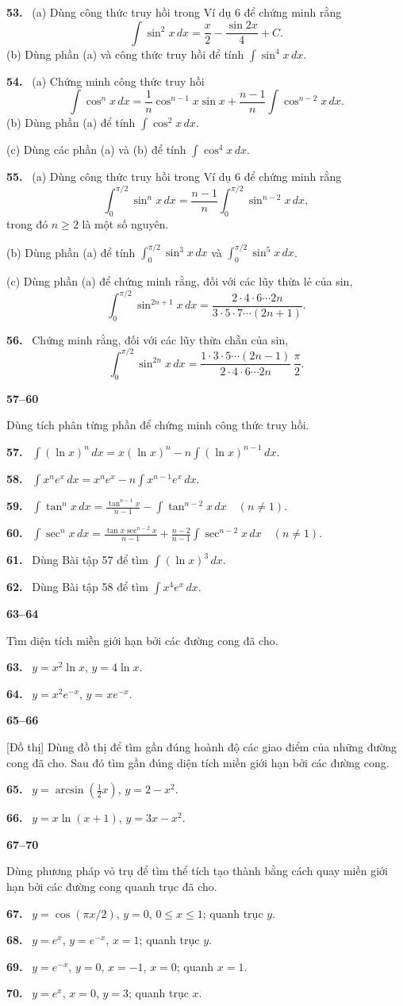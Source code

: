 \documentclass[12pt,a4paper]{article}
\newcommand{\bt}[1]{\par\smallskip\Needspace{5\baselineskip}\noindent\textbf{#1.}\ }
\newcommand{\group}[1]{\par\Needspace{11\baselineskip}\medskip\noindent\textbf{#1}\par\nopagebreak[4]}
\begin{document}
\bt{53} (a) Dùng công thức truy hồi trong Ví dụ 6 để chứng minh rằng
\[\int\sin^2x\,dx=\frac x2-\frac{\sin2x}{4}+C.\]
(b) Dùng phần (a) và công thức truy hồi để tính $\int\sin^4x\,dx$.

\bt{54} (a) Chứng minh công thức truy hồi
\[\int\cos^nx\,dx=\frac1n\cos^{n-1}x\sin x+\frac{n-1}{n}\int\cos^{n-2}x\,dx.\]
(b) Dùng phần (a) để tính $\int\cos^2x\,dx$.

(c) Dùng các phần (a) và (b) để tính $\int\cos^4x\,dx$.

\bt{55} (a) Dùng công thức truy hồi trong Ví dụ 6 để chứng minh rằng
\[\int_0^{\pi/2}\sin^nx\,dx=\frac{n-1}{n}\int_0^{\pi/2}\sin^{n-2}x\,dx,\]
trong đó $n\ge2$ là một số nguyên.

(b) Dùng phần (a) để tính $\int_0^{\pi/2}\sin^3x\,dx$ và $\int_0^{\pi/2}\sin^5x\,dx$.

(c) Dùng phần (a) để chứng minh rằng, đối với các lũy thừa lẻ của sin,
\[\int_0^{\pi/2}\sin^{2n+1}x\,dx=\frac{2\cdot4\cdot6\cdots2n}{3\cdot5\cdot7\cdots(2n+1)}.\]

\bt{56} Chứng minh rằng, đối với các lũy thừa chẵn của sin,
\[\int_0^{\pi/2}\sin^{2n}x\,dx=\frac{1\cdot3\cdot5\cdots(2n-1)}{2\cdot4\cdot6\cdots2n}\,\frac\pi2.\]

\group{57–60} Dùng tích phân từng phần để chứng minh công thức truy hồi.
\bt{57} $\displaystyle\int(\ln x)^n\,dx=x(\ln x)^n-n\int(\ln x)^{n-1}\,dx$.
\bt{58} $\displaystyle\int x^ne^x\,dx=x^ne^x-n\int x^{n-1}e^x\,dx$.
\bt{59} $\displaystyle\int\tan^nx\,dx=\frac{\tan^{n-1}x}{n-1}-\int\tan^{n-2}x\,dx\quad(n\ne1)$.
\bt{60} $\displaystyle\int\sec^nx\,dx=\frac{\tan x\sec^{n-2}x}{n-1}+\frac{n-2}{n-1}\int\sec^{n-2}x\,dx\quad(n\ne1)$.

\bt{61} Dùng Bài tập 57 để tìm $\int(\ln x)^3\,dx$.
\bt{62} Dùng Bài tập 58 để tìm $\int x^4e^x\,dx$.

\group{63–64} Tìm diện tích miền giới hạn bởi các đường cong đã cho.
\bt{63} $y=x^2\ln x$, $y=4\ln x$.
\bt{64} $y=x^2e^{-x}$, $y=xe^{-x}$.

\group{65–66} \textsf{[Đồ thị]} Dùng đồ thị để tìm gần đúng hoành độ các giao điểm của những đường cong đã cho. Sau đó tìm gần đúng diện tích miền giới hạn bởi các đường cong.
\bt{65} $y=\arcsin\left(\frac12x\right)$, $y=2-x^2$.
\bt{66} $y=x\ln(x+1)$, $y=3x-x^2$.

\group{67–70} Dùng phương pháp vỏ trụ để tìm thể tích tạo thành bằng cách quay miền giới hạn bởi các đường cong quanh trục đã cho.
\bt{67} $y=\cos(\pi x/2)$, $y=0$, $0\le x\le1$; quanh trục $y$.
\bt{68} $y=e^x$, $y=e^{-x}$, $x=1$; quanh trục $y$.
\bt{69} $y=e^{-x}$, $y=0$, $x=-1$, $x=0$; quanh $x=1$.
\bt{70} $y=e^x$, $x=0$, $y=3$; quanh trục $x$.
\end{document}
